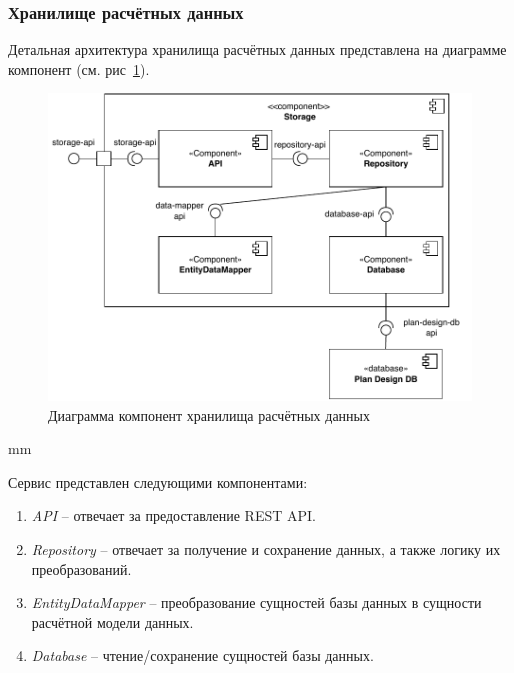 \subsubsection{\large{Хранилище расчётных данных}}

Детальная архитектура хранилища расчётных данных представлена на диаграмме компонент
(см. рис\ \ref{pic:architecture__storage-component}).

\begin{figure}[H]
	\includegraphics[width=\textwidth]{architecture/pictures/storage/component_common}
	\caption{Диаграмма компонент хранилища расчётных данных}
	\label{pic:architecture__storage-component}
\end{figure}
 mm

Сервис представлен следующими компонентами:
\begin{enumerate}
	\item {
		\textit{API} -- отвечает за предоставление REST API.
	}
	\item {
		\textit{Repository} -- отвечает за получение и сохранение данных, а также логику их преобразований.
	}
	\item {
		\textit{EntityDataMapper} -- преобразование сущностей базы данных в сущности расчётной модели данных.
	}
	\item {
		\textit{Database} -- чтение/сохранение сущностей базы данных.
	}
\end{enumerate}